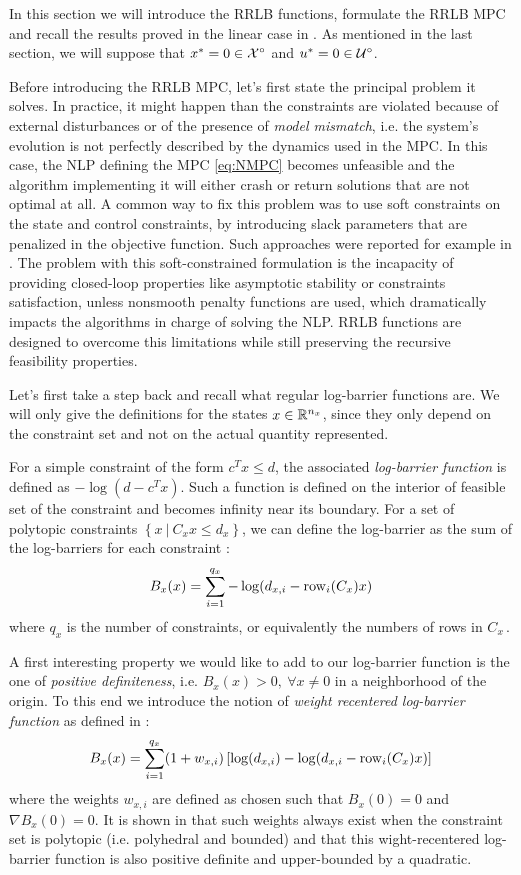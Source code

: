 \documentclass[12pt]{article}
\begin{document}
In this section we will introduce the RRLB functions, formulate the RRLB MPC and recall the results proved in the linear case in \cite{RRLB-linear-MPC}.
As mentioned in the last section, we will suppose that $x^*=0\in\cal{X}^\circ$ and $u^*=0\in\cal{U}^\circ$.

Before introducing the RRLB MPC, let's first state the principal problem it solves.
In practice, it might happen than the constraints are violated because of external disturbances or of the presence of \textit{model mismatch}, i.e. the system's evolution is not perfectly described by the dynamics used in the MPC.
In this case, the NLP defining the MPC \ref{eq:NMPC} becomes unfeasible and the algorithm implementing it will either crash or return solutions that are not optimal at all.
A common way to fix this problem was to use soft constraints on the state and control constraints, by introducing slack parameters that are penalized in the objective function.
Such approaches were reported for example in \cite{soft-constrained-MPC}.
The problem with this soft-constrained formulation is the incapacity of providing closed-loop properties like asymptotic stability or constraints satisfaction, unless nonsmooth penalty functions are used, which dramatically impacts the algorithms in charge of solving the NLP.
RRLB functions are designed to overcome this limitations while still preserving the recursive feasibility properties.

\vspace{12pt}

Let's first take a step back and recall what regular log-barrier functions are.
We will only give the definitions for the states $x\in\R^{n_x}$, since they only depend on the constraint set and not on the actual quantity represented.

For a simple constraint of the form $c^Tx\leq d$, the associated \textit{log-barrier function} is defined as $-\log(d-c^Tx)$.
Such a function is defined on the interior of feasible set of the constraint and becomes infinity near its boundary.
For a set of polytopic constraints $\left\{ x~|~C_xx\leq d_x \right\}$, we can define the log-barrier as the sum of the log-barriers for each constraint :
$$B_x(x)=\sum_{i=1}^{q_x}-\log(d_{x,i}-\rm{row}_i(C_x)x)$$
where $q_x$ is the number of constraints, or equivalently the numbers of rows in $C_x$\,.

A first interesting property we would like to add to our log-barrier function is the one of \textit{positive definiteness}, i.e. $B_x(x)>0,~\forall x\neq 0$ in a neighborhood of the origin.
To this end we introduce the notion of \textit{weight recentered log-barrier function} as defined in \cite{RLB} :
$$B_x(x)=\sum_{i=1}^{q_x}(1+w_{x,i})\left[\log(d_{x,i})-\log(d_{x,i}-\rm{row}_i(C_x)x)\right]$$
where the weights $w_{x,i}$ are defined as chosen such that $B_x(0)=0$ and $\nabla B_x(0)=0$.
It is shown in \cite{RLB} that such weights always exist when the constraint set is polytopic (i.e. polyhedral and bounded) and that this wight-recentered log-barrier function is also positive definite and upper-bounded by a quadratic.
\end{document}
